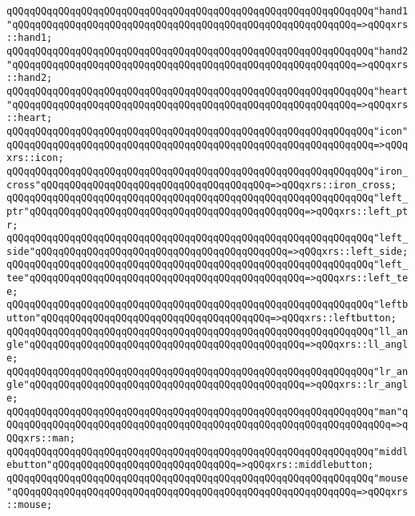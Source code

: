 \verb|qQQqqQQqqQQqqQQqqQQqqQQqqQQqqQQqqQQqqQQqqQQqqQQqqQQqqQQqqQQqqQQq"hand1"qQQqqQQqqQQqqQQqqQQqqQQqqQQqqQQqqQQqqQQqqQQqqQQqqQQqqQQqqQQq=>qQQqxrs::hand1;|\newline
\verb|qQQqqQQqqQQqqQQqqQQqqQQqqQQqqQQqqQQqqQQqqQQqqQQqqQQqqQQqqQQqqQQq"hand2"qQQqqQQqqQQqqQQqqQQqqQQqqQQqqQQqqQQqqQQqqQQqqQQqqQQqqQQqqQQq=>qQQqxrs::hand2;|\newline
\verb|qQQqqQQqqQQqqQQqqQQqqQQqqQQqqQQqqQQqqQQqqQQqqQQqqQQqqQQqqQQqqQQq"heart"qQQqqQQqqQQqqQQqqQQqqQQqqQQqqQQqqQQqqQQqqQQqqQQqqQQqqQQqqQQq=>qQQqxrs::heart;|\newline
\verb|qQQqqQQqqQQqqQQqqQQqqQQqqQQqqQQqqQQqqQQqqQQqqQQqqQQqqQQqqQQqqQQq"icon"qQQqqQQqqQQqqQQqqQQqqQQqqQQqqQQqqQQqqQQqqQQqqQQqqQQqqQQqqQQqqQQq=>qQQqxrs::icon;|\newline
\verb|qQQqqQQqqQQqqQQqqQQqqQQqqQQqqQQqqQQqqQQqqQQqqQQqqQQqqQQqqQQqqQQq"iron_cross"qQQqqQQqqQQqqQQqqQQqqQQqqQQqqQQqqQQqqQQq=>qQQqxrs::iron_cross;|\newline
\verb|qQQqqQQqqQQqqQQqqQQqqQQqqQQqqQQqqQQqqQQqqQQqqQQqqQQqqQQqqQQqqQQq"left_ptr"qQQqqQQqqQQqqQQqqQQqqQQqqQQqqQQqqQQqqQQqqQQqqQQq=>qQQqxrs::left_ptr;|\newline
\verb|qQQqqQQqqQQqqQQqqQQqqQQqqQQqqQQqqQQqqQQqqQQqqQQqqQQqqQQqqQQqqQQq"left_side"qQQqqQQqqQQqqQQqqQQqqQQqqQQqqQQqqQQqqQQqqQQq=>qQQqxrs::left_side;|\newline
\verb|qQQqqQQqqQQqqQQqqQQqqQQqqQQqqQQqqQQqqQQqqQQqqQQqqQQqqQQqqQQqqQQq"left_tee"qQQqqQQqqQQqqQQqqQQqqQQqqQQqqQQqqQQqqQQqqQQqqQQq=>qQQqxrs::left_tee;|\newline
\verb|qQQqqQQqqQQqqQQqqQQqqQQqqQQqqQQqqQQqqQQqqQQqqQQqqQQqqQQqqQQqqQQq"leftbutton"qQQqqQQqqQQqqQQqqQQqqQQqqQQqqQQqqQQqqQQq=>qQQqxrs::leftbutton;|\newline
\verb|qQQqqQQqqQQqqQQqqQQqqQQqqQQqqQQqqQQqqQQqqQQqqQQqqQQqqQQqqQQqqQQq"ll_angle"qQQqqQQqqQQqqQQqqQQqqQQqqQQqqQQqqQQqqQQqqQQqqQQq=>qQQqxrs::ll_angle;|\newline
\verb|qQQqqQQqqQQqqQQqqQQqqQQqqQQqqQQqqQQqqQQqqQQqqQQqqQQqqQQqqQQqqQQq"lr_angle"qQQqqQQqqQQqqQQqqQQqqQQqqQQqqQQqqQQqqQQqqQQqqQQq=>qQQqxrs::lr_angle;|\newline
\verb|qQQqqQQqqQQqqQQqqQQqqQQqqQQqqQQqqQQqqQQqqQQqqQQqqQQqqQQqqQQqqQQq"man"qQQqqQQqqQQqqQQqqQQqqQQqqQQqqQQqqQQqqQQqqQQqqQQqqQQqqQQqqQQqqQQqqQQq=>qQQqxrs::man;|\newline
\verb|qQQqqQQqqQQqqQQqqQQqqQQqqQQqqQQqqQQqqQQqqQQqqQQqqQQqqQQqqQQqqQQq"middlebutton"qQQqqQQqqQQqqQQqqQQqqQQqqQQqqQQq=>qQQqxrs::middlebutton;|\newline
\verb|qQQqqQQqqQQqqQQqqQQqqQQqqQQqqQQqqQQqqQQqqQQqqQQqqQQqqQQqqQQqqQQq"mouse"qQQqqQQqqQQqqQQqqQQqqQQqqQQqqQQqqQQqqQQqqQQqqQQqqQQqqQQqqQQq=>qQQqxrs::mouse;|\newline
